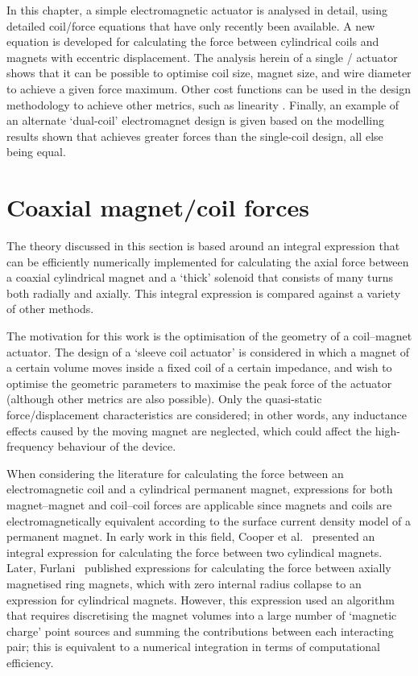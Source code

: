 \documentclass[11pt,a4paper]{memoir}
\begin{document}
In this chapter, a simple electromagnetic actuator is analysed in detail, using detailed coil/force equations that have only recently been available.
A new equation is developed for calculating the force between cylindrical coils and magnets with eccentric displacement.
The analysis herein of a single \dof/ actuator shows that it can be possible to optimise coil size, magnet size, and wire diameter to achieve a given force maximum.
Other cost functions can be used in the design methodology to achieve other metrics, such as linearity \cite{merit2009-ietm}.
Finally, an example of an alternate `dual-coil' electromagnet design is given based on the modelling results shown that achieves greater forces than the single-coil design, all else being equal.


\section{Coaxial magnet/coil forces}

The theory discussed in this section is based around an integral expression that can be efficiently numerically implemented for calculating the axial force between a coaxial cylindrical magnet and a `thick' solenoid that consists of many turns both radially and axially.
This integral expression is compared against a variety of other methods.

The motivation for this work is the optimisation of the geometry of a coil--magnet actuator.
The design of a `sleeve coil actuator' is considered in which a magnet of a certain volume moves inside a fixed coil of a certain impedance, and wish to optimise the geometric parameters to maximise the peak force of the actuator (although other metrics are also possible).
Only the quasi-static force/displacement characteristics are considered; in other words, any inductance effects caused by the moving magnet are neglected, which could affect the high-frequency behaviour of the device.

When considering the literature for calculating the force between an electromagnetic coil and a cylindrical permanent magnet, expressions for both magnet--magnet and coil--coil forces are applicable since magnets and coils are electromagnetically equivalent according to the surface current density model of a permanent magnet.
In early work in this field, Cooper et al.~\cite{cooper1973-ietm} presented an integral expression for calculating the force between two cylindical magnets.
Later, Furlani~\cite{furlani1993-ietm} published expressions for calculating the force between axially magnetised ring magnets, which with zero internal radius collapse to an expression for cylindrical magnets.
However, this expression used an algorithm that requires discretising the magnet volumes into a large number of `magnetic charge' point sources and summing the contributions between each interacting pair; this is equivalent to a numerical integration in terms of computational efficiency.
\end{document}
